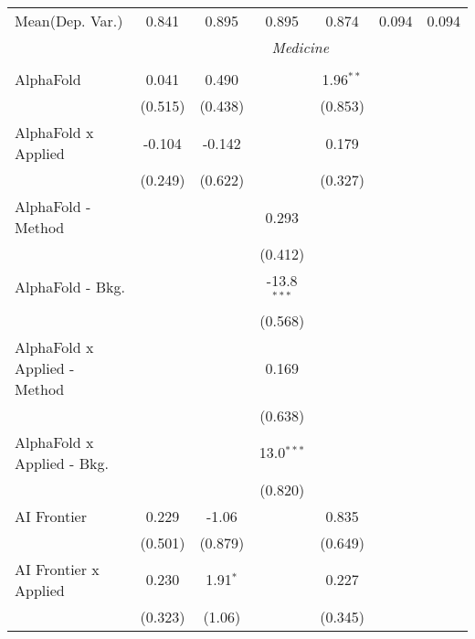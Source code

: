 \begin{tabular}{lcccccc}
Mean(Dep. Var.) & 0.841 & 0.895 & 0.895 & 0.874 & 0.094 & 0.094 \\
 & \multicolumn{6}{c}{\textit{Medicine}} \\ \\
   AlphaFold                      & 0.041    & 0.490        &               & 1.96$^{**}$    &        &   \\   
                                  & (0.515)  & (0.438)      &               & (0.853)        &        &   \\   
   AlphaFold x Applied            & -0.104   & -0.142       &               & 0.179          &        &   \\   
                                  & (0.249)  & (0.622)      &               & (0.327)        &        &   \\   
   AlphaFold - Method             &          &              & 0.293         &                &        &   \\   
                                  &          &              & (0.412)       &                &        &   \\   
   AlphaFold - Bkg.               &          &              & -13.8$^{***}$ &                &        &   \\   
                                  &          &              & (0.568)       &                &        &   \\   
   AlphaFold x Applied - Method   &          &              & 0.169         &                &        &   \\   
                                  &          &              & (0.638)       &                &        &   \\   
   AlphaFold x Applied - Bkg.     &          &              & 13.0$^{***}$  &                &        &   \\   
                                  &          &              & (0.820)       &                &        &   \\   
   AI Frontier                    & 0.229    & -1.06        &               & 0.835          &        &   \\   
                                  & (0.501)  & (0.879)      &               & (0.649)        &        &   \\   
   AI Frontier x Applied          & 0.230    & 1.91$^{*}$   &               & 0.227          &        &   \\   
                                  & (0.323)  & (1.06)       &               & (0.345)        &        &   \\   

\end{tabular}
